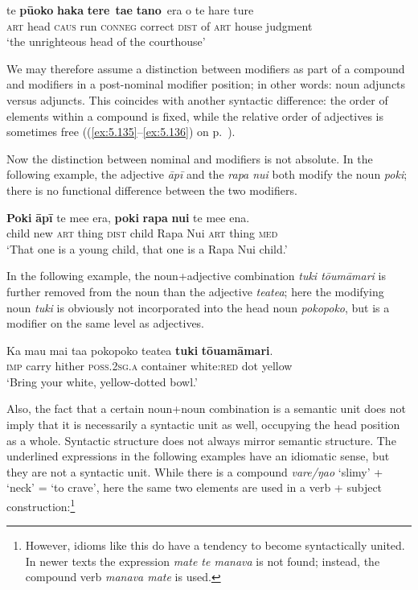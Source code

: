 \ea\label{ex:5.107}
\gll te {\ob}\textbf{pū{\ꞌ}oko} \textbf{haka} \textbf{tere}\,{\cb} {\ob}\textbf{ta{\ꞌ}e} \textbf{tano}\,{\cb} era o te hare ture \\
\textsc{art} {\db}head \textsc{caus} run {\db}\textsc{conneg} correct \textsc{dist} of \textsc{art} house judgment \\

\glt
‘the unrighteous head of the courthouse’ \textstyleExampleref{[Luke 18:6]}
\z

We may therefore assume a distinction between modifiers as part of a compound and modifiers in a post-nominal modifier position; in other words: noun adjuncts versus  adjuncts. This coincides with another syntactic difference: the order of elements within a compound is fixed, while the relative order of adjectives is sometimes free ((\ref{ex:5.135}–\ref{ex:5.136}) on p.~\pageref{ex:5.135}).

Now the distinction between nominal and  modifiers is not absolute. In the following example, the adjective \textit{{\ꞌ}āpī} and the  \textit{rapa nui} both modify the noun \textit{poki}; there is no functional difference between the two modifiers.

\ea\label{ex:5.108}
\gll \textbf{Poki} \textbf{{\ꞌ}āpī} te me{\ꞌ}e era, \textbf{poki} \textbf{rapa} \textbf{nui} te me{\ꞌ}e ena. \\
child new \textsc{art} thing \textsc{dist} child Rapa Nui \textsc{art} thing \textsc{med} \\

\glt
‘That one is a young child, that one is a Rapa Nui child.’ \textstyleExampleref{[R416.238]} 
\z

In the following example, the noun+adjective combination \textit{tuki tōumāmari} is further removed from the noun than the adjective \textit{teatea}; here the modifying noun \textit{tuki} is obviously not incorporated into the head noun \textit{pokopoko}, but is a modifier on the same level as adjectives.

\ea\label{ex:5.109}
\gll Ka ma{\ꞌ}u mai ta{\ꞌ}a pokopoko teatea \textbf{tuki} \textbf{tōuamāmari}. \\
\textsc{imp} carry hither \textsc{poss.2sg.a} container white:\textsc{red} dot yellow \\

\glt
‘Bring your white, yellow-dotted bowl.’ \textstyleExampleref{[Notes]}
\z

Also, the fact that a certain noun+noun combination is a semantic unit does not imply that it is necessarily a syntactic unit as well, occupying the head position as a whole. Syntactic structure does not always mirror semantic structure. The underlined expressions in the following examples have an idiomatic sense, but they are not a syntactic unit. While there is a compound \textit{vare/ŋao} ‘slimy’ + ‘neck’ = ‘to crave’, here the same two elements are used in a verb + subject construction:\footnote{\label{fn:266}However, idioms like this do have a tendency to become syntactically united. In newer texts the expression \textit{mate te manava} is not found; instead, the compound verb \textit{manava mate} is used.}


